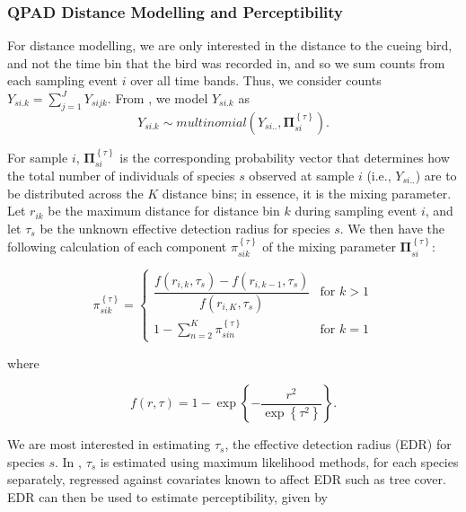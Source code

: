 \documentclass[12pt]{article}
\begin{document}
\subsubsection{QPAD Distance Modelling and Perceptibility}

\par For distance modelling, we are only interested in the distance to the cueing bird, and not the time bin that the bird was recorded in, and so we sum counts from each sampling event $i$ over all time bands. 
Thus, we consider counts ${Y}_{si.k} = \sum_{j=1}^{J}{Y}_{sijk}$. 
From \citet{solymos_calibrating_2013}, we model ${Y}_{si.k}$ as
$${Y}_{si.k} \sim multinomial\left({Y}_{si..}, \mathbf{\Pi}_{si}^{\left\{\tau\right\}}\right).$$

\par For sample $i$, $\mathbf{\Pi}_{si}^{\left\{\tau\right\}}$ is the corresponding probability vector that determines how the total number of individuals of species $s$ observed at sample $i$ (i.e., ${Y}_{si..}$) are to be distributed across the $K$ distance bins; in essence, it is the mixing parameter. 
Let $r_{ik}$ be the maximum distance for distance bin $k$ during sampling event $i$, and let $\tau_s$ be the unknown effective detection radius for species $s$. 
We then have the following calculation of each component $\pi_{sik}^{\left\{\tau\right\}}$ of the mixing parameter $\mathbf{\Pi}_{si}^{\left\{\tau\right\}}$:

\begin{equation}\label{eq:distance}
	\pi_{sik}^{\left\{\tau\right\}} = 
	\begin{cases}
		\dfrac{f(r_{i,k}, \tau_s) - f(r_{i,k-1}, \tau_s)}{f(r_{i,K}, \tau_s)} & \text{for } k > 1 \\
		1 - \sum_{n = 2}^{K} \pi_{sin}^{\left\{\tau\right\}} & \text{for } k = 1
	\end{cases}
\end{equation}

where

$$f(r,\tau) =  1 - \exp\left\{ -\dfrac{r^2}{\exp\left\{\tau^2\right\}} \right\}.$$

\par We are most interested in estimating $\tau_s$, the effective detection radius (EDR) for species $s$. 
In \citep{solymos_calibrating_2013}, $\tau_s$ is estimated using maximum likelihood methods, for each species separately, regressed against covariates known to affect EDR such as tree cover.
EDR can then be used to estimate perceptibility, given by
\end{document}
